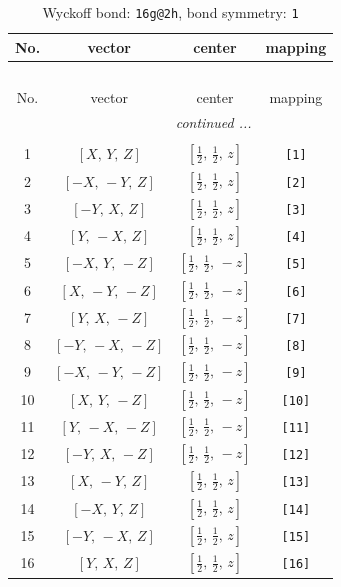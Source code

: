 \documentclass[fleqn,8pt]{jsarticle}
\begin{document}
\begin{longtable}{cccc}
\caption{Wyckoff bond: {\tt 16g@2h}, bond symmetry: {\tt 1}}
 \\
 \hline \hline
No. & vector & center & mapping \\ \hline \endfirsthead

\multicolumn{3}{l}{\tablename\ \thetable{}} \\
 \hline \hline
No. & vector & center & mapping \\ \hline \endhead

 \hline \hline
\multicolumn{3}{r}{\footnotesize\it continued ...} \\ \endfoot

 \hline \hline
\multicolumn{3}{r}{} \\ \endlastfoot

1 & $\left[ X,\, Y,\, Z \right]$ & $\left[ \frac{1}{2},\, \frac{1}{2},\, z \right]$ & {\tt [1]} \\ \hline
2 & $\left[ - X,\, - Y,\, Z \right]$ & $\left[ \frac{1}{2},\, \frac{1}{2},\, z \right]$ & {\tt [2]} \\ \hline
3 & $\left[ - Y,\, X,\, Z \right]$ & $\left[ \frac{1}{2},\, \frac{1}{2},\, z \right]$ & {\tt [3]} \\ \hline
4 & $\left[ Y,\, - X,\, Z \right]$ & $\left[ \frac{1}{2},\, \frac{1}{2},\, z \right]$ & {\tt [4]} \\ \hline
5 & $\left[ - X,\, Y,\, - Z \right]$ & $\left[ \frac{1}{2},\, \frac{1}{2},\, - z \right]$ & {\tt [5]} \\ \hline
6 & $\left[ X,\, - Y,\, - Z \right]$ & $\left[ \frac{1}{2},\, \frac{1}{2},\, - z \right]$ & {\tt [6]} \\ \hline
7 & $\left[ Y,\, X,\, - Z \right]$ & $\left[ \frac{1}{2},\, \frac{1}{2},\, - z \right]$ & {\tt [7]} \\ \hline
8 & $\left[ - Y,\, - X,\, - Z \right]$ & $\left[ \frac{1}{2},\, \frac{1}{2},\, - z \right]$ & {\tt [8]} \\ \hline
9 & $\left[ - X,\, - Y,\, - Z \right]$ & $\left[ \frac{1}{2},\, \frac{1}{2},\, - z \right]$ & {\tt [9]} \\ \hline
10 & $\left[ X,\, Y,\, - Z \right]$ & $\left[ \frac{1}{2},\, \frac{1}{2},\, - z \right]$ & {\tt [10]} \\ \hline
11 & $\left[ Y,\, - X,\, - Z \right]$ & $\left[ \frac{1}{2},\, \frac{1}{2},\, - z \right]$ & {\tt [11]} \\ \hline
12 & $\left[ - Y,\, X,\, - Z \right]$ & $\left[ \frac{1}{2},\, \frac{1}{2},\, - z \right]$ & {\tt [12]} \\ \hline
13 & $\left[ X,\, - Y,\, Z \right]$ & $\left[ \frac{1}{2},\, \frac{1}{2},\, z \right]$ & {\tt [13]} \\ \hline
14 & $\left[ - X,\, Y,\, Z \right]$ & $\left[ \frac{1}{2},\, \frac{1}{2},\, z \right]$ & {\tt [14]} \\ \hline
15 & $\left[ - Y,\, - X,\, Z \right]$ & $\left[ \frac{1}{2},\, \frac{1}{2},\, z \right]$ & {\tt [15]} \\ \hline
16 & $\left[ Y,\, X,\, Z \right]$ & $\left[ \frac{1}{2},\, \frac{1}{2},\, z \right]$ & {\tt [16]} \\
\end{longtable}
\end{document}
